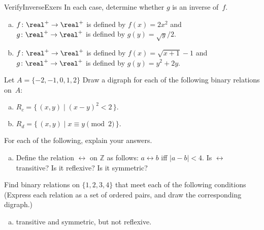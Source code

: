 \begin{exercise}{VerifyInverseExers}
 In each case, determine whether $g$ is an inverse of~$f$.
 \begin{enumerate}[(a)]
 \item \label{VerifyInverseExers-(x^2)}
$f \colon \real^+ \to \real^+$ is defined by $f(x) =2x^2$ and 
 \\ $g \colon \real^+ \to \real^+$ is defined by $g(y) = \sqrt{y}/2$.
 \item \label{VerifyInverseExers-(sqrt(x+1)-1)}
$f \colon \real^+ \to \real^+$ is defined by $f(x) = \sqrt{x+1} - 1$ and 
 \\ $g \colon \real^+ \to \real^+$ is defined by $g(y) = y^2 + 2y$.
 \end{enumerate}
 \end{exercise}

\begin{exer} \label{DrawBinRelExer}
Let $A =  \{-2,-1,0,1,2\}$ Draw a digraph for each of the following binary relations on~$A$: 
 \begin{enumerate}[(a)]
 \item \label{DrawBinRelExer-married}
 $ R_c = \{\, (x,y) \mid  (x-y)^2 < 2 \,\} .$
  \item \label{DrawBinRelExer-lived}
$ R_d = \{\, (x,y) \mid  x\equiv y \pmod{2} \,\} .$
 \end{enumerate}
 \end{exer}

\begin{exercise}{17}
For each of the following, explain your answers. 
\begin{enumerate}[(a)]
\item Define the relation $\rel$ on $\mathbb{Z}$ as follows: $ a \rel b$ iff $|a - b|< 4$. Is $\rel$ transitive? Is it reflexive? Is it symmetric?
\end{enumerate}
\end{exercise}

\begin{exer} \label{BinRelSomePropsEx}
Find binary relations on $\{1,2,3,4\}$ that meet each of the following conditions 
(Express each relation as a set of ordered pairs, and draw the corresponding digraph.)
\begin{enumerate}[(a)]
\item \label{BinRelSomePropsEx-transandsymm}
transitive and symmetric, but not reflexive.
\end{enumerate}
\end{exer}

